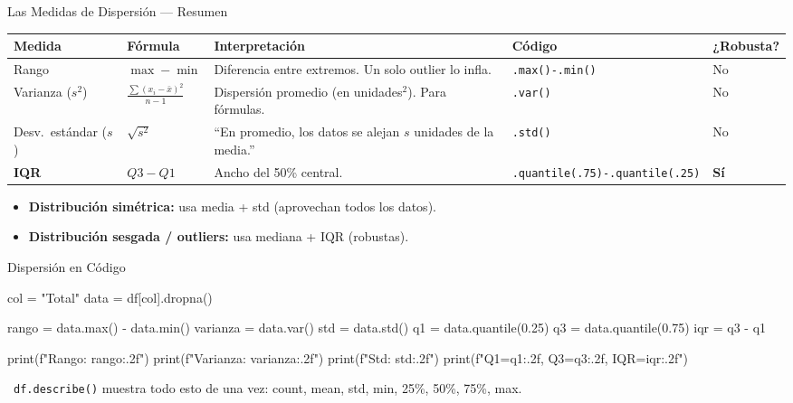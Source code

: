\documentclass[aspectratio=169, 11pt]{beamer}
\begin{document}
\begin{frame}[shrink=25]{Las Medidas de Dispersión --- Resumen}
  \vspace{-4pt}
  {\small
  \begin{tabular}{@{}llp{4.5cm}ll@{}}
    \toprule
    \textbf{Medida} & \textbf{Fórmula} & \textbf{Interpretación} & \textbf{Código} & \textbf{¿Robusta?} \\
    \midrule
    Rango & $\max - \min$ &
      Diferencia entre extremos. Un solo outlier lo infla. &
      \texttt{.max()-.min()} & No \\[4pt]
    Varianza ($s^2$) & $\frac{\sum(x_i - \bar{x})^2}{n-1}$ &
      Dispersión promedio (en unidades$^2$). Para fórmulas. &
      \texttt{.var()} & No \\[4pt]
    Desv.\ estándar ($s$) & $\sqrt{s^2}$ &
      ``En promedio, los datos se alejan $s$ unidades de la media.'' &
      \texttt{.std()} & No \\[4pt]
    \textbf{IQR} & $Q3 - Q1$ &
      Ancho del 50\% central. &
      \texttt{.quantile(.75)}\newline\texttt{-.quantile(.25)} & \textbf{Sí} \\
    \bottomrule
  \end{tabular}
  }

  \vspace{6pt}
  {\scriptsize\color{textMuted}
  \begin{itemize}\setlength{\itemsep}{3pt}
    \item[{\color{codeGreen}\scriptsize\faCheckCircle}]
      \textbf{Distribución simétrica:} usa media + std (aprovechan todos los datos).
    \item[{\color{codeOrange}\scriptsize\faExclamationTriangle}]
      \textbf{Distribución sesgada / outliers:} usa mediana + IQR (robustas).
  \end{itemize}
  }
\end{frame}

\begin{frame}[fragile,shrink=28]{Dispersión en Código}
  \vspace{-6pt}
  \begin{pyblock}
col = "Total"
data = df[col].dropna()

rango = data.max() - data.min()
varianza = data.var()
std = data.std()
q1 = data.quantile(0.25)
q3 = data.quantile(0.75)
iqr = q3 - q1

print(f"Rango:     {rango:.2f}")
print(f"Varianza:  {varianza:.2f}")
print(f"Std:       {std:.2f}")
print(f"Q1={q1:.2f}, Q3={q3:.2f}, IQR={iqr:.2f}")
  \end{pyblock}

  \vspace{4pt}
  {\scriptsize\color{textMuted}
    \faLightbulb\ \texttt{df.describe()} muestra todo esto de una vez: count, mean, std, min, 25\%, 50\%, 75\%, max.}
\end{frame}
\end{document}
